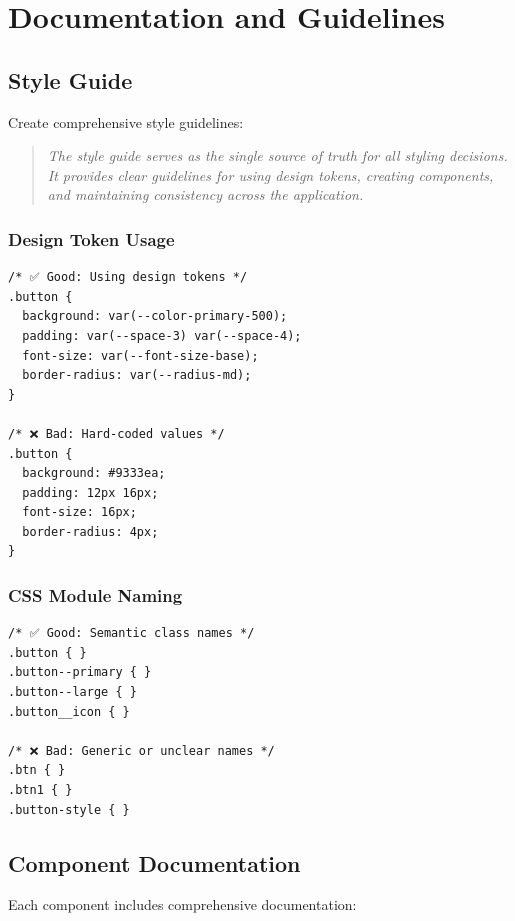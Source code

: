 \documentclass[11pt]{article}
\begin{document}
\section{Documentation and Guidelines}

\subsection{Style Guide}

Create comprehensive style guidelines:

\begin{quote}
\emph{The style guide serves as the single source of truth for all styling decisions. It provides clear guidelines for using design tokens, creating components, and maintaining consistency across the application.}
\end{quote}

\subsubsection{Design Token Usage}

\begin{lstlisting}[style=css]
/* ✅ Good: Using design tokens */
.button {
  background: var(--color-primary-500);
  padding: var(--space-3) var(--space-4);
  font-size: var(--font-size-base);
  border-radius: var(--radius-md);
}

/* ❌ Bad: Hard-coded values */
.button {
  background: #9333ea;
  padding: 12px 16px;
  font-size: 16px;
  border-radius: 4px;
}
\end{lstlisting}

\subsubsection{CSS Module Naming}

\begin{lstlisting}[style=css]
/* ✅ Good: Semantic class names */
.button { }
.button--primary { }
.button--large { }
.button__icon { }

/* ❌ Bad: Generic or unclear names */
.btn { }
.btn1 { }
.button-style { }
\end{lstlisting}

\subsection{Component Documentation}

Each component includes comprehensive documentation:
\end{document}
